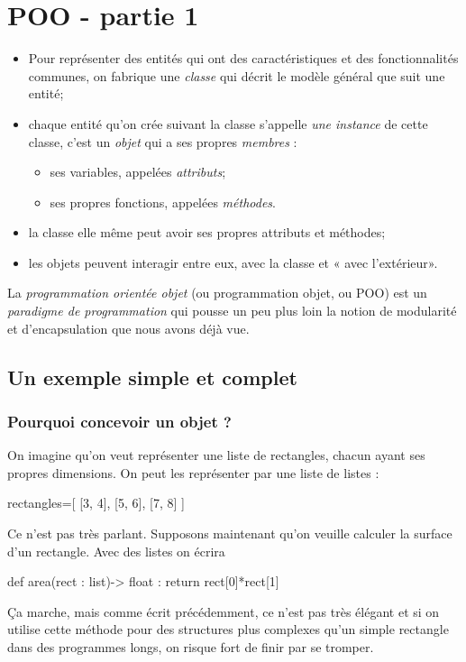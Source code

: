 \documentclass[a4paper,10pt,cours,firamath]{nsi}
\begin{document}
\chapter{POO - partie 1}


\begin{aretenir}
    \begin{itemize}
        \item     Pour représenter des  entités qui ont des caractéristiques et des fonctionnalités communes, on fabrique  une \textit{classe} qui décrit le modèle général que suit une entité;
        \item     chaque entité qu'on crée suivant la classe s'appelle \textit{une instance} de cette classe, c'est un \textit{objet} qui a ses propres \textit{membres} :
              \begin{itemize}
                  \item     ses variables, appelées \textit{attributs};
                  \item     ses propres fonctions, appelées \textit{méthodes}.
              \end{itemize}
        \item     la classe elle même peut avoir ses propres attributs et méthodes;
        \item     les objets peuvent interagir entre eux, avec la classe et « avec l'extérieur».
    \end{itemize}
    
\end{aretenir}

La \textit{programmation orientée objet} (ou programmation objet, ou POO) est un \textit{paradigme de programmation} qui pousse un peu plus loin la notion de modularité et d'encapsulation que nous avons déjà vue. 

\section{Un exemple simple et complet}

\subsection{Pourquoi concevoir un objet ?}
On imagine qu'on veut représenter une liste de rectangles, chacun ayant ses propres dimensions. On peut les représenter par une liste de listes :
\begin{pyc}
    rectangles=[
    [3, 4], 
    [5, 6], 
    [7, 8]
    ]
\end{pyc}
Ce n'est pas très parlant. 
Supposons maintenant qu'on veuille calculer la surface d'un rectangle. Avec des listes on écrira
\begin{pyc}
    def area(rect : list)-> float :
    return rect[0]*rect[1]
\end{pyc}
Ça marche, mais comme écrit précédemment, ce n'est pas très élégant et si on utilise cette méthode pour des structures plus complexes qu'un simple rectangle dans des programmes longs, on risque fort de finir par se tromper.\\
\end{document}
